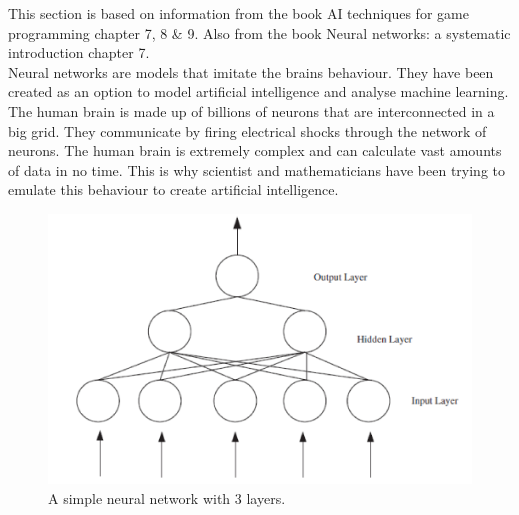 This section is based on information from the book AI techniques for game programming\cite{buckland2002ai} chapter 7, 8 \& 9. Also from the book Neural networks: a systematic introduction\cite{rojas1996neural} chapter 7.
\\[0.5cm]
Neural networks are models that imitate the brains behaviour. They have been created as an option to model artificial intelligence and analyse machine learning. The human brain is made up of billions of neurons that are interconnected in a big grid. They communicate by firing electrical shocks through the network of neurons. The human brain is extremely complex and can calculate vast amounts of data in no time. This is why scientist and mathematicians have been trying to emulate this behaviour to create artificial intelligence.

\begin{figure}[h!]
\centering
\includegraphics[width=0.8\linewidth,natwidth=898,natheight=587]{billeder/ANN.png}
\caption{A simple neural network with 3 layers. \cite{stockForecasting}}
\label{fig:ANN}
\end{figure}


